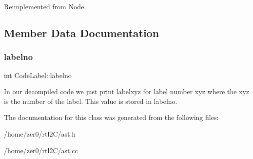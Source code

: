 Reimplemented from \hyperlink{class_node_a3e67ec8d22182b721717af14fe0c3000}{Node}.



\subsection{Member Data Documentation}
\mbox{\label{class_code_label_a6dd4c69e6bc1c0b479d2bea79b0aa568}} 
\subsubsection{\texorpdfstring{labelno}{labelno}}
{\footnotesize\ttfamily int Code\+Label\+::labelno\hspace{0.3cm}{\ttfamily [protected]}}

In our decompiled code we just print labelxyz for label number xyz where the xyz is the number of the label. This value is stored in labelno. 

The documentation for this class was generated from the following files\+:\begin{DoxyCompactItemize}
\item 
/home/zer0/rtl2\+C/ast.\+h\item 
/home/zer0/rtl2\+C/ast.\+cc\end{DoxyCompactItemize}
